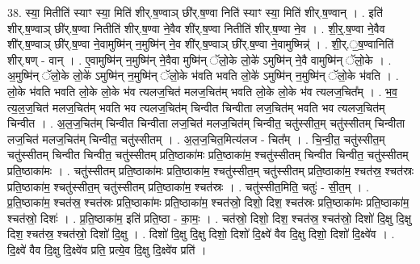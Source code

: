 \documentclass[17pt]{extarticle}
\begin{document}
38. स्या॒ मितीति॑ स्याꣳ स्या॒ मिति॑ शीर्.ष॒ण्वाञ् छी॑र्.ष॒ण्वा निति॑ स्याꣳ स्या॒ मिति॑ शीर्.ष॒ण्वान् । . इति॑ शीर्.ष॒ण्वाञ् छी॑र्.ष॒ण्वा नितीति॑ शीर्.ष॒ण्वा ने॒वैव शी॑र्.ष॒ण्वा नितीति॑ शीर्.ष॒ण्वा ने॒व । . शी॒र्॒.ष॒ण्वा ने॒वैव शी॑र्.ष॒ण्वाञ् छी॑र्.ष॒ण्वा ने॒वामुष्मि॑न् न॒मुष्मि॑न् ने॒व शी॑र्.ष॒ण्वाञ् छी॑र्.ष॒ण्वा ने॒वामुष्मिन्न्॑ । . शी॒र्.॒ष॒ण्वानिति॑ शीर्.षण् - वान् । . ए॒वामुष्मि॑न् न॒मुष्मि॑न् ने॒वैवा मुष्मि॑न् ॅलो॒के लो॒के॑ ऽमुष्मि॑न् ने॒वै वामुष्मि॑न् ॅलो॒के । . अ॒मुष्मि॑न् ॅलो॒के लो॒के॑ ऽमुष्मि॑न् न॒मुष्मि॑न् ॅलो॒के भ॑वति भवति लो॒के॑ ऽमुष्मि॑न् न॒मुष्मि॑न् ॅलो॒के भ॑वति । . लो॒के भ॑वति भवति लो॒के लो॒के भ॑व त्यलज॒चित॑ मलज॒चित॑म् भवति लो॒के लो॒के भ॑व त्यलज॒चित᳚म् । . भ॒व॒ त्य॒ल॒ज॒चित॑ मलज॒चित॑म् भवति भव त्यलज॒चित॑म् चिन्वीत चिन्वीता लज॒चित॑म् भवति भव त्यलज॒चित॑म् चिन्वीत । . अ॒ल॒ज॒चित॑म् चिन्वीत चिन्वीता लज॒चित॑ मलज॒चित॑म् चिन्वीत॒ चतु॑स्सीत॒म् चतु॑स्सीतम् चिन्वीता लज॒चित॑ मलज॒चित॑म् चिन्वीत॒ चतु॑स्सीतम् । . अ॒ल॒ज॒चित॒मित्य॑लज - चित᳚म् । . चि॒न्वी॒त॒ चतु॑स्सीत॒म् चतु॑स्सीतम् चिन्वीत चिन्वीत॒ चतु॑स्सीतम् प्रति॒ष्ठाका॑मः प्रति॒ष्ठाका॑म॒ श्चतु॑स्सीतम् चिन्वीत चिन्वीत॒ चतु॑स्सीतम् प्रति॒ष्ठाका॑मः । . चतु॑स्सीतम् प्रति॒ष्ठाका॑मः प्रति॒ष्ठाका॑म॒ श्चतु॑स्सीत॒म् चतु॑स्सीतम् प्रति॒ष्ठाका॑म॒ श्चत॑स्र॒ श्चत॑स्रः प्रति॒ष्ठाका॑म॒ श्चतु॑स्सीत॒म् चतु॑स्सीतम् प्रति॒ष्ठाका॑म॒ श्चत॑स्रः । . चतु॑स्सीत॒मिति॒ चतुः॑ - सी॒त॒म् । . प्र॒ति॒ष्ठाका॑म॒ श्चत॑स्र॒ श्चत॑स्रः प्रति॒ष्ठाका॑मः प्रति॒ष्ठाका॑म॒ श्चत॑स्रो॒ दिशो॒ दिश॒ श्चत॑स्रः प्रति॒ष्ठाका॑मः प्रति॒ष्ठाका॑म॒ श्चत॑स्रो॒ दिशः॑ । . प्र॒ति॒ष्ठाका॑म॒ इति॑ प्रति॒ष्ठा - का॒मः॒ । . चत॑स्रो॒ दिशो॒ दिश॒ श्चत॑स्र॒ श्चत॑स्रो॒ दिशो॑ दि॒क्षु दि॒क्षु दिश॒ श्चत॑स्र॒ श्चत॑स्रो॒ दिशो॑ दि॒क्षु । . दिशो॑ दि॒क्षु दि॒क्षु दिशो॒ दिशो॑ दि॒क्ष्वे॑ वैव दि॒क्षु दिशो॒ दिशो॑ दि॒क्ष्वे॑व । . दि॒क्ष्वे॑ वैव दि॒क्षु दि॒क्ष्वे॑व प्रति॒ प्रत्ये॒व दि॒क्षु दि॒क्ष्वे॑व प्रति॑ । \newline
\end{document}
